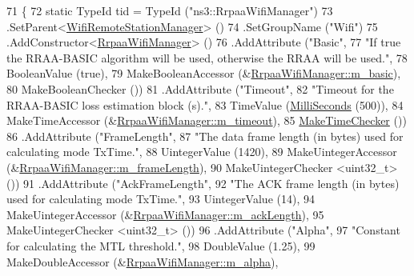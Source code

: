 \begin{DoxyCode}
71 \{
72   \textcolor{keyword}{static} TypeId tid = TypeId (\textcolor{stringliteral}{"ns3::RrpaaWifiManager"})
73     .SetParent<\hyperlink{classns3_1_1WifiRemoteStationManager_a78524840f5900e1937e8e2d6df48954d}{WifiRemoteStationManager}> ()
74     .SetGroupName (\textcolor{stringliteral}{"Wifi"})
75     .AddConstructor<\hyperlink{classns3_1_1RrpaaWifiManager_a27c80be50ff13155f630a7dd0c9b53fd}{RrpaaWifiManager}> ()
76     .AddAttribute (\textcolor{stringliteral}{"Basic"},
77                    \textcolor{stringliteral}{"If true the RRAA-BASIC algorithm will be used, otherwise the RRAA will be used."},
78                    BooleanValue (\textcolor{keyword}{true}),
79                    MakeBooleanAccessor (&\hyperlink{classns3_1_1RrpaaWifiManager_a253f22b8b3fb9452a710ef9ab8dbbd30}{RrpaaWifiManager::m\_basic}),
80                    MakeBooleanChecker ())
81     .AddAttribute (\textcolor{stringliteral}{"Timeout"},
82                    \textcolor{stringliteral}{"Timeout for the RRAA-BASIC loss estimation block (s)."},
83                    TimeValue (\hyperlink{group__timecivil_gaf26127cf4571146b83a92ee18679c7a9}{MilliSeconds} (500)),
84                    MakeTimeAccessor (&\hyperlink{classns3_1_1RrpaaWifiManager_a86e264f2035d972d66a105a9c4c6d5f3}{RrpaaWifiManager::m\_timeout}),
85                    \hyperlink{group__time_ga7032965bd4afa578691d88c09e4481c1}{MakeTimeChecker} ())
86     .AddAttribute (\textcolor{stringliteral}{"FrameLength"},
87                    \textcolor{stringliteral}{"The data frame length (in bytes) used for calculating mode TxTime."},
88                    UintegerValue (1420),
89                    MakeUintegerAccessor (&\hyperlink{classns3_1_1RrpaaWifiManager_ae5f18f7b27c353b749aaddf404c6b3df}{RrpaaWifiManager::m\_frameLength}),
90                    MakeUintegerChecker <uint32\_t> ())
91     .AddAttribute (\textcolor{stringliteral}{"AckFrameLength"},
92                    \textcolor{stringliteral}{"The ACK frame length (in bytes) used for calculating mode TxTime."},
93                    UintegerValue (14),
94                    MakeUintegerAccessor (&\hyperlink{classns3_1_1RrpaaWifiManager_a9af8ff237ac2e99e3c0e5d50285bdbb0}{RrpaaWifiManager::m\_ackLength}),
95                    MakeUintegerChecker <uint32\_t> ())
96     .AddAttribute (\textcolor{stringliteral}{"Alpha"},
97                    \textcolor{stringliteral}{"Constant for calculating the MTL threshold."},
98                    DoubleValue (1.25),
99                    MakeDoubleAccessor (&\hyperlink{classns3_1_1RrpaaWifiManager_ad2dee5b7cd74a92d50467b2bae11263c}{RrpaaWifiManager::m\_alpha}),

\end{DoxyCode}
